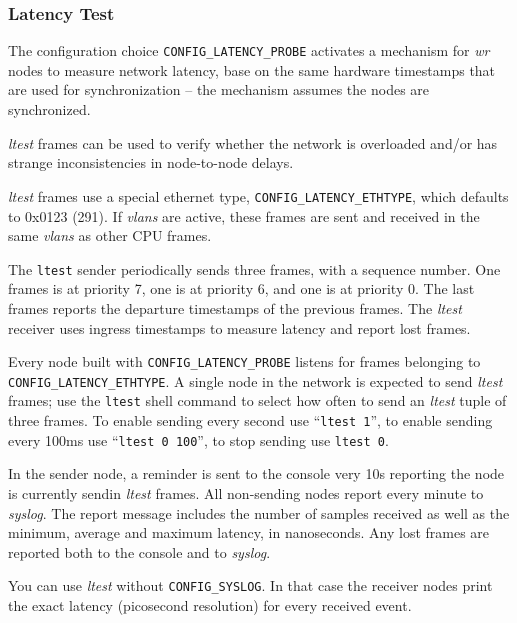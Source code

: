\documentclass[a4paper, 12pt]{article}
\begin{document}
\label{Latency Test}
\subsubsection{Latency Test}

The configuration choice \texttt{CONFIG\_LATENCY\_PROBE} activates a
mechanism for \textit{wr} nodes to measure network latency, base on the same
hardware timestamps that are used for synchronization -- the mechanism
assumes the nodes are synchronized.

\textit{ltest} frames can be used to verify whether the network is
overloaded and/or has strange inconsistencies in node-to-node delays.

\textit{ltest} frames use a special ethernet type, \texttt{CONFIG\_LATENCY\_ETHTYPE},
which defaults to 0x0123 (291). If \textit{vlans} are active, these frames
are sent and received in the same \textit{vlans} as other CPU frames.

The \texttt{ltest} sender periodically sends three frames, with a sequence
number. One frames is at priority 7, one is at priority 6, and one is
at priority 0. The last frames reports the departure timestamps of the
previous frames.  The \textit{ltest} receiver uses ingress timestamps to
measure latency and report lost frames.

Every node built with \texttt{CONFIG\_LATENCY\_PROBE} listens for frames
belonging to \texttt{CONFIG\_LATENCY\_ETHTYPE}.  A single node in the
network is expected to send \textit{ltest} frames; use the \texttt{ltest}
shell command to select how often to send an \textit{ltest} tuple of three
frames. To enable sending every second use ``\texttt{ltest 1}'', to enable
sending every 100ms use ``\texttt{ltest 0 100}'', to stop sending use
\texttt{ltest 0}.

In the sender node, a reminder is sent to the console very 10s
reporting the node is currently sendin \textit{ltest} frames.  All
non-sending nodes report every minute to \textit{syslog}. The
report message includes the number of samples received as well
as the minimum, average and maximum latency, in nanoseconds.
Any lost frames are reported both to the console and to \textit{syslog}.

You can use \textit{ltest} without \texttt{CONFIG\_SYSLOG}. In that case the
receiver nodes print the exact latency (picosecond resolution) for
every received event.

\label{wrpc-dump}
\end{document}
